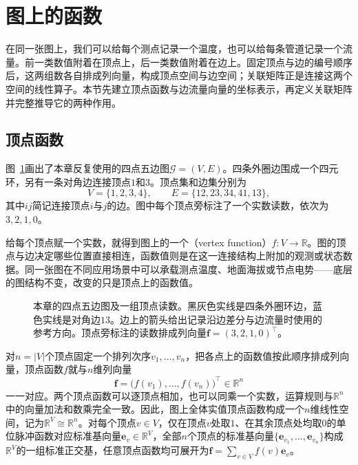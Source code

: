\section{图上的函数}
\label{sec:graph-vertex-edge-functions}

在同一张图上，我们可以给每个测点记录一个温度，也可以给每条管道记录一个流量。前一类数值附着在顶点上，后一类数值附着在边上。固定顶点与边的编号顺序后，这两组数各自排成列向量，构成顶点空间与边空间；关联矩阵正是连接这两个空间的线性算子。本节先建立顶点函数与边流量向量的坐标表示，再定义关联矩阵并完整推导它的两种作用。

\subsection{顶点函数}
\label{sec:incidence-vertex-functions}

图~\ref{fig:incidence-running-example}画出了本章反复使用的四点五边图$\mathcal{G}=(V,E)$。四条外圈边围成一个四元环，另有一条对角边连接顶点$1$和$3$。顶点集和边集分别为
\[
V=\{1,2,3,4\},\qquad E=\{12,23,34,41,13\},
\]
其中$ij$简记连接顶点$i$与$j$的边。图中每个顶点旁标注了一个实数读数，依次为$3,2,1,0$。

给每个顶点赋一个实数，就得到图上的一个（vertex function）$f\colon V\to\mathbb{R}$。图的顶点与边决定哪些位置直接相连，函数值则是在这一连接结构上附加的观测或状态数据。同一张图在不同应用场景中可以承载测点温度、地面海拔或节点电势——底层的图结构不变，改变的只是顶点上的函数值。

\begin{figure}[!htb]
  \centering
  
  \caption{本章的四点五边图及一组顶点读数。黑灰色实线是四条外圈环边，蓝色实线是对角边$13$。边上的箭头给出记录沿边差分与边流量时使用的参考方向。顶点旁标注的读数排成列向量$\bm{f}=(3,2,1,0)^\top$。}
  \label{fig:incidence-running-example}
\end{figure}

对$n=|V|$个顶点固定一个排列次序$v_1,\ldots,v_n$，把各点上的函数值按此顺序排成列向量，顶点函数$f$就与$n$维列向量
\[
\bm{f}=\bigl(f(v_1),\ldots,f(v_n)\bigr)^\top\in\mathbb{R}^n
\]
一一对应。两个顶点函数可以逐顶点相加，也可以同乘一个实数，运算规则与$\mathbb{R}^n$中的向量加法和数乘完全一致。因此，图上全体实值顶点函数构成一个$n$维线性空间，记为$\mathbb{R}^V\cong\mathbb{R}^n$。对每个顶点$v\in V$，仅在顶点$v$处取$1$、在其余顶点处均取$0$的单位脉冲函数对应标准基向量$\bm{e}_v\in\mathbb{R}^V$，全部$n$个顶点的标准基向量$\{\bm{e}_{v_1},\ldots,\bm{e}_{v_n}\}$构成$\mathbb{R}^V$的一组标准正交基，任意顶点函数均可展开为$\bm{f}=\sum_{v\in V}f(v)\bm{e}_v$。

